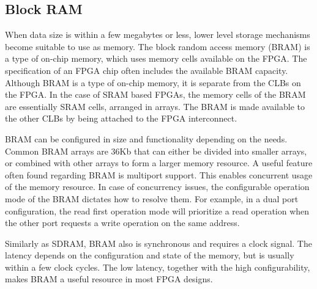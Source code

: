 \documentclass[12pt]{report}
\begin{document}


\subsection{Block RAM}
When data size is within a few megabytes or less, lower level storage mechanisms become suitable to use as memory. The block random access memory (BRAM) is a type of on-chip memory, which uses memory cells available on the FPGA. The specification of an FPGA chip often includes the available BRAM capacity. Although BRAM is a type of on-chip memory, it is separate from the CLBs on the FPGA. In the case of SRAM based FPGAs, the memory cells of the BRAM are essentially SRAM cells, arranged in arrays. The BRAM is made available to the other CLBs by being attached to the FPGA interconnect.
\par
BRAM can be configured in size and functionality depending on the needs. Common BRAM arrays are 36Kb that can either be divided into smaller arrays, or combined with other arrays to form a larger memory resource. A useful feature often found regarding BRAM is multiport support. This enables concurrent usage of the memory resource. In case of concurrency issues, the configurable operation mode of the BRAM dictates how to resolve them. For example, in a dual port configuration, the read first operation mode will prioritize a read operation when the other port requests a write operation on the same address. \citep{XilMemMan}
\par
\par
Similarly as SDRAM, BRAM also is synchronous and requires a clock signal. The latency depends on the configuration and state of the memory, but is usually within a few clock cycles. The low latency, together with the high configurability, makes BRAM a useful resource in most FPGA designs. \citep{XilMemMan}
\end{document}
